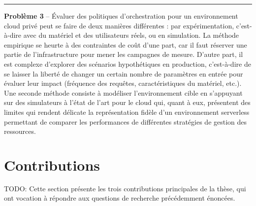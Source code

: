 
\begin{center}
    \rule{4cm}{0.4pt}
\end{center}

\textbf{Problème 3} -- Évaluer des politiques d'orchestration pour un environnement cloud privé peut se faire de deux manières différentes : par expérimentation, c'est-à-dire avec du matériel et des utilisateurs réels, ou en simulation. La méthode empirique se heurte à des contraintes de coût d'une part, car il faut réserver une partie de l'infrastructure pour mener les campagnes de mesure. D'autre part, il est complexe d'explorer des scénarios hypothétiques en production, c'est-à-dire de se laisser la liberté de changer un certain nombre de paramètres en entrée pour évaluer leur impact (fréquence des requêtes, caractéristiques du matériel, etc.). Une seconde méthode consiste à modéliser l'environnement cible en s'appuyant sur des simulateurs à l'état de l'art pour le cloud qui, quant à eux, présentent des limites qui rendent délicate la représentation fidèle d'un environnement serverless permettant de comparer les performances de différentes stratégies de gestion des ressources.


\section{Contributions}

TODO: Cette section présente les trois contributions principales de la thèse, qui ont vocation à répondre aux questions de recherche précédemment énoncées.

